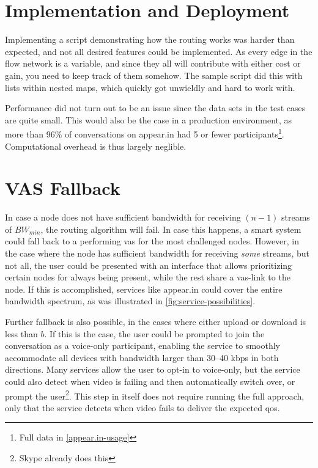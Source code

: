 \section{Implementation and Deployment}

Implementing a script demonstrating how the routing works was harder than expected, and not all desired features could be implemented. As every edge in the flow network is a variable, and since they all will contribute with either cost or gain, you need to keep track of them somehow. The sample script did this with lists within nested maps, which quickly got unwieldly and hard to work with.

Performance did not turn out to be an issue since the data sets in the test cases are quite small. This would also be the case in a production environment, as more than 96\% of conversations on appear.in had 5 or fewer participants\footnote{Full data in \autoref{appear.in-usage}}. Computational overhead is thus largely neglible.


\section{VAS Fallback}

In case a node does not have sufficient bandwidth for receiving $(n-1)$ streams of $BW_{min}$, the routing algorithm will fail. In case this happens, a smart system could fall back to a performing \gls{vas} for the most challenged nodes. However, in the case where the node has sufficient bandwidth for receiving \emph{some} streams, but not all, the user could be presented with an interface that allows prioritizing certain nodes for always being present, while the rest share a \gls{vas}-link to the node. If this is accomplished, services like appear.in could cover the entire bandwidth spectrum, as was illustrated in \autoref{fig:service-possibilities}.

Further fallback is also possible, in the cases where either upload or download is less than $b$. If this is the case, the user could be prompted to join the conversation as a voice-only participant, enabling the service to smoothly accommodate all devices with bandwidth larger than 30--40 kbps in both directions. Many services allow the user to opt-in to voice-only, but the service could also detect when video is failing and then automatically switch over, or prompt the user\footnote{Skype already does this}. This step in itself does not require running the full approach, only that the service detects when video fails to deliver the expected \gls{qos}.


